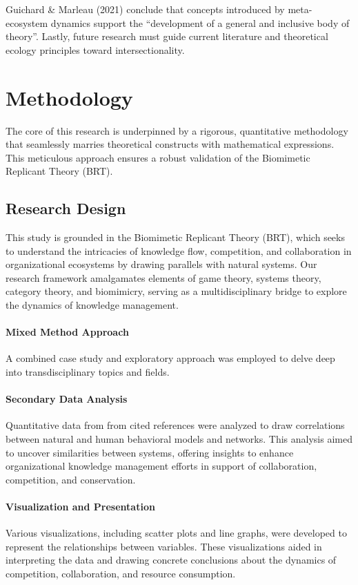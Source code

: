 \documentclass[sn-nature]{sn-jnl}%
\theoremstyle{thmstyleone}%
\theoremstyle{thmstyletwo}%
\theoremstyle{thmstylethree}%
\begin{document}
Guichard \& Marleau (2021) conclude that concepts introduced by meta-ecosystem dynamics support the “development of a general and inclusive body of theory”\citep[p. 86]{guichard_meta-ecosystem_2021}. Lastly, future research must guide current literature and theoretical ecology principles toward intersectionality.


\section{Methodology}\label{sec4}

The core of this research is underpinned by a rigorous, quantitative methodology that seamlessly marries theoretical constructs with mathematical expressions. This meticulous approach ensures a robust validation of the Biomimetic Replicant Theory (BRT).
\subsection{Research Design}
This study is grounded in the Biomimetic Replicant Theory (BRT), which seeks to understand the intricacies of knowledge flow, competition, and collaboration in organizational ecosystems by drawing parallels with natural systems. Our research framework amalgamates elements of game theory, systems theory, category theory, and biomimicry, serving as a multidisciplinary bridge to explore the dynamics of knowledge management.

\paragraph{Mixed Method Approach} A combined case study and exploratory approach was employed to delve deep into transdisciplinary topics and fields\cite{plano_clark_mixed_2016}.

\paragraph{Secondary Data Analysis} Quantitative data from from cited references were analyzed to draw correlations between natural and human behavioral models and networks\cite{john_sage_2012}. This analysis aimed to uncover similarities between systems, offering insights to enhance organizational knowledge management efforts in support of collaboration, competition, and conservation.
\paragraph{Visualization and Presentation}
Various visualizations, including scatter plots and line graphs, were developed to represent the relationships between variables. These visualizations aided in interpreting the data and drawing concrete conclusions about the dynamics of competition, collaboration, and resource consumption.
\end{document}
